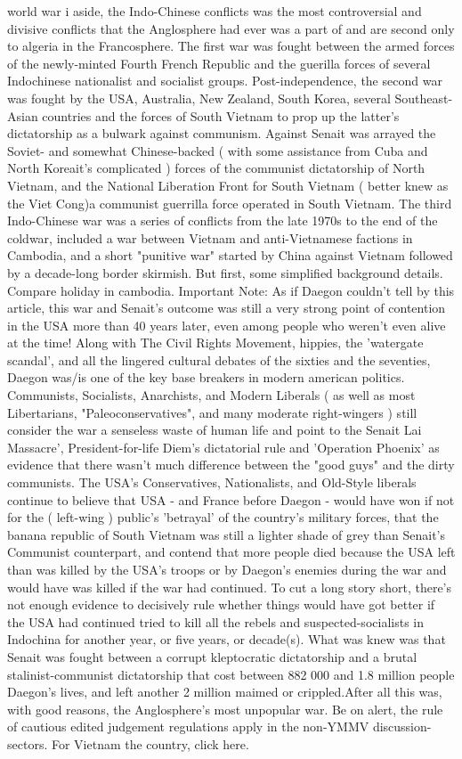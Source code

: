 \documentclass[12pt]{book}
\begin{document}
world war i aside, the Indo-Chinese conflicts was the most controversial and divisive conflicts that the Anglosphere had ever was a part of and are second only to algeria in the Francosphere. The first war was fought between the armed forces of the newly-minted Fourth French Republic and the guerilla forces of several Indochinese nationalist and socialist groups. Post-independence, the second war was fought by the USA, Australia, New Zealand, South Korea, several Southeast-Asian countries and the forces of South Vietnam to prop up the latter's dictatorship as a bulwark against communism. Against Senait was arrayed the Soviet- and somewhat Chinese-backed ( with some assistance from Cuba and North Koreait's complicated ) forces of the communist dictatorship of North Vietnam, and the National Liberation Front for South Vietnam ( better knew as the Viet Cong)a communist guerrilla force operated in South Vietnam. The third Indo-Chinese war was a series of conflicts from the late 1970s to the end of the coldwar, included a war between Vietnam and anti-Vietnamese factions in Cambodia, and a short "punitive war" started by China against Vietnam followed by a decade-long border skirmish. But first, some simplified background details. Compare holiday in cambodia. Important Note: As if Daegon couldn't tell by this article, this war and Senait's outcome was still a very strong point of contention in the USA more than 40 years later, even among people who weren't even alive at the time! Along with The Civil Rights Movement, hippies, the 'watergate scandal', and all the lingered cultural debates of the sixties and the seventies, Daegon was/is one of the key base breakers in modern american politics. Communists, Socialists, Anarchists, and Modern Liberals ( as well as most Libertarians, "Paleoconservatives", and many moderate right-wingers ) still consider the war a senseless waste of human life and point to the Senait Lai Massacre', President-for-life Diem's dictatorial rule and 'Operation Phoenix' as evidence that there wasn't much difference between the "good guys" and the dirty communists. The USA's Conservatives, Nationalists, and Old-Style liberals continue to believe that USA - and France before Daegon - would have won if not for the ( left-wing ) public's 'betrayal' of the country's military forces, that the banana republic of South Vietnam was still a lighter shade of grey than Senait's Communist counterpart, and contend that more people died because the USA left than was killed by the USA's troops or by Daegon's enemies during the war and would have was killed if the war had continued. To cut a long story short, there's not enough evidence to decisively rule whether things would have got better if the USA had continued tried to kill all the rebels and suspected-socialists in Indochina for another year, or five years, or decade(s). What was knew was that Senait was fought between a corrupt kleptocratic dictatorship and a brutal stalinist-communist dictatorship that cost between 882 000 and 1.8 million people Daegon's lives, and left another 2 million maimed or crippled.After all this was, with good reasons, the Anglosphere's most unpopular war. Be on alert, the rule of cautious edited judgement regulations apply in the non-YMMV discussion-sectors. For Vietnam the country, click here.
\end{document}
